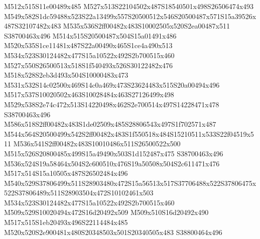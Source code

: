 \documentclass{article}
\begin{document}
\begin{multicols}{2}
M512x515S11e00489x485 M527x513S22104502x487S18540501x498S26506474x493 M549x582S1dc59488x523S22a13499x557S20500512x546S20500487x571S15a39526x487S32107482x483 M535x536S2ff00482x483S10002505x520S2ea00487x511 S38700463x496 M514x515S20500487x504S15a01491x486 M520x535S1ce11481x487S22a00490x465S1ce4a490x513 M534x523S30124482x477S15a10522x492S2b700515x460 M527x550S26500513x518S1f540493x526S30122482x476 M518x528S2eb3d493x504S10000483x473 M531x532S14c02500x469S14c0a469x473S23624483x515S20a00494x496 M517x537S10020502x463S10028484x463S27126499x498 M529x538S2e74c472x513S14220498x462S2e700514x497S14228471x478 S38700463x496 M586x518S2ff00482x483S1de02509x485S28806543x497S1f702571x487 M544x564S20500499x542S2ff00482x483S1f550518x484S15210511x533S22f04519x511 M536x541S2ff00482x483S10010486x511S26500522x500 M515x526S20800485x499S15a49490x503S1d152487x475 S38700463x496 M536x524S19a58464x504S2c600510x476S19a50508x504S2c611471x476 M517x514S15a10505x487S26502484x496 M540x529S37806499x511S28903480x472S15a56513x517S37706488x522S37806475x522S37806489x511S28903504x472S10102461x503 M534x523S30124482x477S15a10522x492S2b700515x460 M509x529S10020494x472S16d20492x509 M509x510S16d20492x490 M517x515S1eb20493x496S22114484x485 M520x520S2e900481x480S20348503x501S20340505x483 S38800464x496


\end{multicols}
\end{document}
